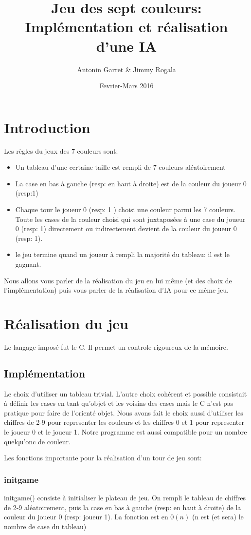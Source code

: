 \documentclass[11pt]{article}
\title{Jeu des sept couleurs: Implémentation et réalisation d'une IA}
\author{Antonin Garret & Jimmy Rogala}
\date{Fevrier-Mars 2016}
\begin{document}
  \maketitle
  \section*{Introduction}
    Les règles du jeux des 7 couleurs sont:
    \begin{itemize} %
      \item Un tableau d'une certaine taille est rempli de 7 couleurs aléatoirement
      \item La case en bas à gauche (resp: en haut à droite) est de la couleur du joueur 0 (resp:1)
      \item Chaque tour le joueur 0 (resp: 1 ) choisi une couleur parmi les 7 couleurs. Toute les cases de la couleur choisi qui sont juxtaposées à une case du joueur 0 (resp: 1) directement ou indirectement devient de la couleur du joueur 0 (resp: 1).
      \item le jeu termine quand un joueur à rempli la majorité du tableau: il est le gagnant.
    \end{itemize}
    Nous allons vous parler de la réalisation du jeu en lui même (et des choix de l'implémentation) puis vous parler de la réalisation d'IA pour ce même jeu.
  \section{Réalisation du jeu}
    Le langage imposé fut le C. Il permet un controle rigoureux de la mémoire.
    \subsection{Implémentation}
      Le choix d'utiliser un tableau trivial. L'autre choix cohérent et possible consistait à définir les cases en tant qu'objet et les voisins des cases mais le C n'est pas pratique pour faire de l'orienté objet.
      Nous avons fait le choix aussi d'utiliser les chiffres de 2-9 pour representer les couleurs et les chiffres 0 et 1 pour representer le joueur 0 et le joueur 1. Notre programme est aussi compatible pour un nombre quelqu'onc de couleur.

      Les fonctions importante pour la réalisation d'un tour de jeu sont:
      \subsubsection{initgame}
        initgame() consiste à initialiser le plateau de jeu. On rempli le tableau de chiffres de 2-9 aléatoirement, puis la case en bas à gauche (resp: en haut à droite) de la couleur du joueur 0 (resp: joueur 1). La fonction est en $0(n)$ (n est (et sera) le nombre de case du tableau)
\end{document}
